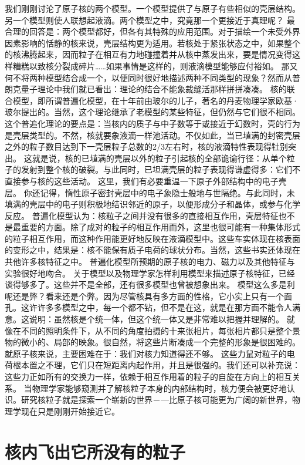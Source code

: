 我们刚刚讨沦了原子核的两个模型。一个模型提供了与原子有些相似的壳层结构。另一个模型则使人联想起液滴。两个模型之中，究竟那一个更接近于真理呢？
最合理的回答是：两个模型都好，但各有其特殊的应用范围。对于描绘一个未受外界因素影响的恬静的核来说，壳层结构更为适用。若核处于紧张状态之中，如果整个的核沸腾起来，因而粒子在相互有力地碰撞着并从核中蒸发出来，要是情况变得这样糟糕以致核分裂成碎片……如果事情是这样的，则液滴模型能够应付裕如。
那又何不将两种模型结合成一个，以便同时很好地描述两种不同类型的现象？然而从普朗克量子理论中我们就已看出：理论的结合不能象裁缝活那样拼拼凑凑。
核的联合模型，即所谓普遍化模型，在十年前由玻尔的儿子，著名的丹麦物理学家欧基·玻尔提出的。当然，这个理论继承了老模型的某些特征，但仍然与它们很不相同。
这个普追化理论的要点是：当核内的质子与中子数等于或接近于幻数时，壳的行为是壳层类型的。不然，核就要象液滴一样池活动。不仅如此，当已埴满的封密壳层之外的粒子数目达到下一壳层粒子总数的2/3左右时，核的液滴特性表现得牡别突出。
这就是说，核的已埴满的壳层以外的粒子引起核的全部诡谕行径：从单个粒子的发射到整个核的破裂。与此同时，已坦满壳层的粒子表现得谦虚得多：它们不直接参与核的这些活动。
这里，我们有必要重温一下原子外部结构中的电子壳层。
你还记得，惰性原子密封壳层中的电子象隐士般地与世隔绝。与此同时，未填满的壳层中的电子则积极地结识邻近的原子，以便形成分子和晶体，或参与化学反应。
普遍化模型认为：核粒子之间并没有很多的直接相互作用，壳层特征也不是最重要的方面。除了成对的粒子的相互作用而外，这里也很可能有一种集体形式的粒子相互作用，而这种作用能更好地反映在液滴模型中。这些车实体现在核表面的变形之中，结果是：核不能保有质子电荷的球状分布。当然，这些书实还体现在共他许多核特征之中。
普遍化模型所预期的原子核的电力、磁力以及其他特征与实验很好地吻合。
关于模型以及物理学家怎样利用模型来描述原子核特征，已经谈得够多了。这些并不是全部，还有很多模型也曾被想象出来。
模型这么多是利呢还是弊？看来还是个弊。因为尽管核具有多方面的性格，它小实上只有一个面孔。这许许多多模型之中，每一个都不钻，但不是在这，就是在那方面不能令人满意。这说明：虽然核是个统一体，但这个统一体又是非常难以把握并理解的。
就像在不同的照明条件下，从不同的角度拍摄的十来张相片，每张相片都只是整个景物的微小的、局部的映象。很自然，将这些片断凑成一个完整的形象是很困难的。
就原子核来说，主要困难在于：我们对核力知道得还不够。
这些力鼠对粒子的电荷根本置之不理，它们只在短距离内起作用，并且是很强的。我们还可以补充说：这些力正如所有的交换力一样，依赖于相互作用着的粒子的自旋在方向上的相互关系。
当物理学家能够窥测并了解核粒子本身的内部结构时，核力便会被更好地认识。研究核粒子就是探索一个崭新的世界－—比原子核可能更为广阔的新世界，物理学现在只是刚刚开始接近它。

\section{核内飞出它所没有的粒子}

